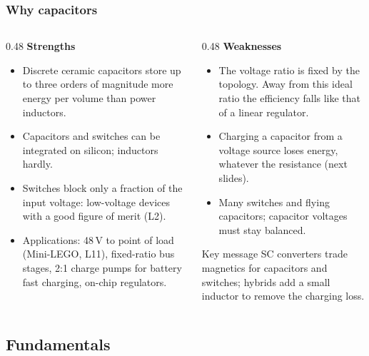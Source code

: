 \begin{frame}
	\frametitle{Why capacitors}
	\begin{columns}[T]
		\begin{column}{0.48\textwidth}
			\small
			\textbf{Strengths}
			\begin{itemize}
				\item Discrete ceramic capacitors store up to three orders of magnitude more energy per volume than power inductors.
				\item Capacitors and switches can be integrated on silicon; inductors hardly.
				\item Switches block only a fraction of the input voltage: low-voltage devices with a good figure of merit (L2).
				\item Applications: 48\,V to point of load (Mini-LEGO, L11), fixed-ratio bus stages, 2:1 charge pumps for battery fast charging, on-chip regulators.
			\end{itemize}
		\end{column}
		\begin{column}{0.48\textwidth}
			\small
			\textbf{Weaknesses}
			\begin{itemize}
				\item The voltage ratio is fixed by the topology. Away from this ideal ratio the efficiency falls like that of a linear regulator.
				\item Charging a capacitor from a voltage source loses energy, whatever the resistance (next slides).
				\item Many switches and flying capacitors; capacitor voltages must stay balanced.
			\end{itemize}
			\begin{block}{Key message}
				SC converters trade magnetics for capacitors and switches; hybrids add a small inductor to remove the charging loss.
			\end{block}
		\end{column}
	\end{columns}
\end{frame}

\subsection{Fundamentals}

